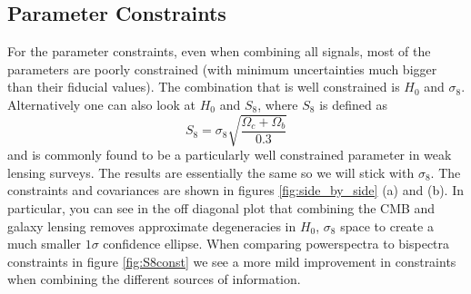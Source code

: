 \documentclass[11pt]{article} %
\begin{document}
\subsection{Parameter Constraints}
For the parameter constraints, even when combining all signals, most of the parameters are poorly constrained (with minimum uncertainties much bigger than their fiducial values). The combination that is well constrained is $H_0$ and $\sigma_8$. Alternatively one can also look at $H_0$ and $S_8$, where $S_8$ is defined as 
\begin{equation*}
    S_8 = \sigma_8 \sqrt{\frac{\Omega_c + \Omega_b}{0.3}}
\end{equation*}
and is commonly found to be a particularly well constrained parameter in weak lensing surveys. The results are essentially the same so we will stick with $\sigma_8$. The constraints and covariances are shown in figures \ref{fig:side_by_side} (a) and (b). In particular, you can see in  the off diagonal plot that combining the CMB and galaxy lensing removes approximate degeneracies in $H_0$, $\sigma_8$ space to create a much smaller $1\sigma$ confidence ellipse. When comparing powerspectra to bispectra constraints in figure \ref{fig:S8const} we see a more mild improvement in constraints when combining the different sources of information.
\end{document}
